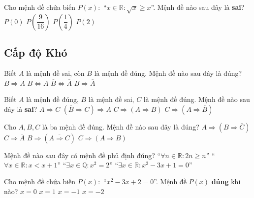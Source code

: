 \begin{ex}%
	Cho mệnh đề chứa biến $P(x)\colon$ ``$x\in\mathbb{R}\colon \sqrt{x}\ge x$''. Mệnh đề nào sau đây là \textbf{sai}?
	\choice
	{$P(0)$}
	{$P\left(\dfrac{9}{16}\right)$}
	{$P\left(\dfrac{1}{4}\right)$}
	{\True $P(2)$}
\end{ex}

\subsection*{Cấp độ Khó}
\begin{ex}%
	Biết $A$ là mệnh đề sai, còn $B$ là mệnh đề đúng. Mệnh đề nào sau đây là đúng?
	\choice
	{$B\Rightarrow A$}
	{$B\Leftrightarrow A$}
	{$\overline{B}\Leftrightarrow\overline{A}$}
	{\True $B\Rightarrow\overline{A}$}
\end{ex}
\begin{ex}%
	Biết $A$ là mệnh đề đúng, $B$ là mệnh đề sai, $C$ là mệnh đề đúng. Mệnh đề nào sau đây là \textbf{sai}?
	\choice
	{$A\Rightarrow C$}
	{$\left(\overline{B}\Rightarrow C\right)\Rightarrow A$}
	{\True $C\Rightarrow\left(A\Rightarrow B\right)$}
	{$C\Rightarrow\left(A\Rightarrow\overline{B}\right)$}
\end{ex}
\begin{ex}%
	Cho $A, B, C$ là ba mệnh đề đúng. Mệnh đề nào sau đây là đúng?
	\choice
	{$A\Rightarrow \left(B\Rightarrow \overline{C}\right)$}
	{$C\Rightarrow \overline{A}$}
	{$B\Rightarrow \left(\overline{A\Rightarrow C}\right)$}
	{\True $C\Rightarrow \left(A\Rightarrow B\right)$}
\end{ex}
\begin{ex}%
	Mệnh đề nào sau đây có mệnh đề phủ định đúng? 
	\choice
	{\True ``$\forall n\in\mathbb{R}\colon 2n\geq n$''}
	{``$\forall x\in\mathbb{R}\colon x<x+1$''}
	{``$\exists x\in\mathbb{Q}\colon x^2=2$''}
	{``$\exists x\in\mathbb{R}\colon x^2-3x+1=0$''}
\end{ex}
\begin{ex}%
	Cho mệnh đề chứa biến $P\left(x\right)\colon$ ``$x^2-3x+2=0$''. Mệnh đề $P\left(x\right)$ \textbf{đúng} khi nào?  
	\choice
	{$x=0$}
	{\True $x=1$}
	{$x=-1$}
	{$x=-2$}
\end{ex}
